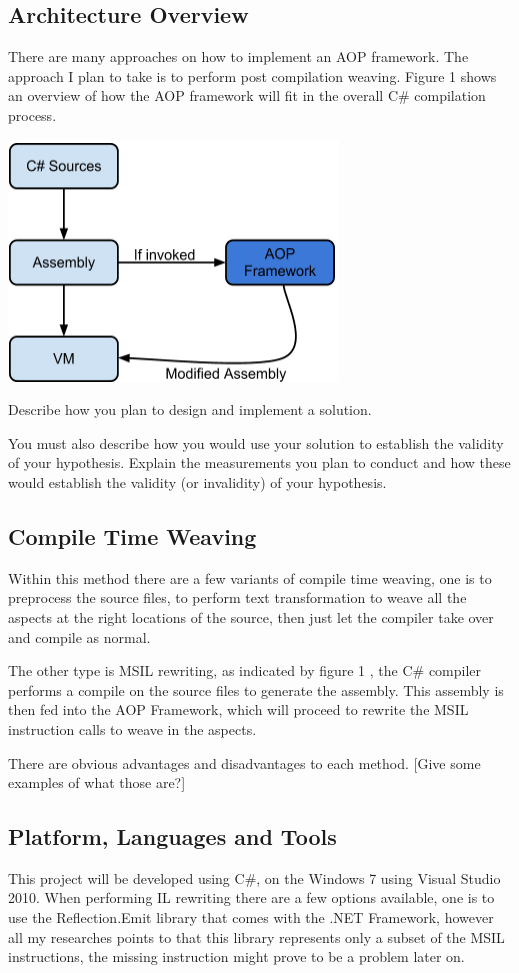 \subsection{Architecture Overview}
There are many approaches on how to implement an AOP framework. The approach I plan to take is to perform post compilation weaving. Figure 1 shows an overview of how the AOP framework will fit in the overall C\# compilation process.

\includegraphics[width=331px,keepaspectratio=true]{model_overview.png}

Describe how you plan to design and implement a solution. 

You must also describe how you would use your solution to establish the validity of your hypothesis. Explain the measurements you plan to conduct and how these would establish the validity (or invalidity) of your hypothesis.

\subsection{Compile Time Weaving}
Within this method there are a few variants of compile time weaving, one is to preprocess the source files, to perform text transformation to weave all the aspects at the right locations of the source, then just let the compiler take over and compile as normal.

The other type is MSIL rewriting, as indicated by figure 1 , the C\# compiler performs a compile on the source files to generate the assembly. This assembly is then fed into the AOP Framework, which will proceed to rewrite the MSIL instruction calls to weave in the aspects.

There are obvious advantages and disadvantages to each method. [Give some examples of what those are?]

\subsection{Platform, Languages and Tools}
This project will be developed using C\#, on the Windows 7 using Visual Studio 2010. When performing IL rewriting there are a few options available, one is to use the Reflection.Emit library that comes with the .NET Framework, however all my researches points to that this library represents only a subset of the MSIL instructions, the missing instruction might prove to be a problem later on.

